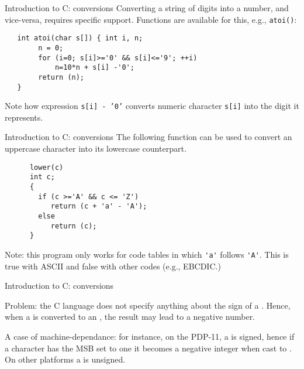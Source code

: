 \begin{frame}[fragile]{Introduction to C: conversions}
Converting a string of digits into a number, and vice-versa,
requires specific support.
Functions are available for this, e.g., \verb"atoi()":


\vspace{20pt}

\begin{tt}
\begin{verbatim}
   int atoi(char s[]) { int i, n;
        n = 0;
        for (i=0; s[i]>='0' && s[i]<='9'; ++i)
            n=10*n + s[i] -'0';
        return (n);
   }
\end{verbatim}
\end{tt}


\vspace{20pt}

Note how expression  {\tt s[i] - '0'} converts numeric character
\verb"s[i]" into the digit it represents.


\end{frame}
\begin{frame}[fragile]{Introduction to C: conversions}
The following function can be used to convert an uppercase character
into its lowercase counterpart.


\vspace{20pt}

\begin{tt}
\begin{verbatim}
      lower(c)
      int c;
      {
        if (c >='A' && c <= 'Z')
           return (c + 'a' - 'A');
        else
           return (c);
      }
\end{verbatim}
\end{tt}


\vspace{20pt}

Note: this program only works for code tables in which \verb"'a'"
follows \verb"'A'". This is true with ASCII and false with other codes
(e.g., EBCDIC.)


\end{frame}
\begin{frame}[fragile]{Introduction to C: conversions}

Problem: the C language does not specify anything about the sign of a \Char.
Hence, when a \Char is converted to an \Int, the result may lead to 
a negative number.


\vspace{20pt}

A case of machine-dependance: for instance, on the PDP-11, a \Char{} is signed, hence
if a character has the MSB set to one it becomes a
negative integer when cast to \Int. On other platforms a \Char{}
is unsigned.


\end{frame}
